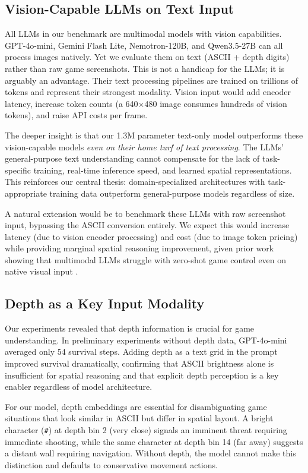 \documentclass[11pt,a4paper]{article}
\begin{document}
\subsection{Vision-Capable LLMs on Text Input}

All LLMs in our benchmark are multimodal models with vision capabilities. GPT-4o-mini, Gemini Flash Lite, Nemotron-120B, and Qwen3.5-27B can all process images natively. Yet we evaluate them on text (ASCII + depth digits) rather than raw game screenshots. This is not a handicap for the LLMs; it is arguably an advantage. Their text processing pipelines are trained on trillions of tokens and represent their strongest modality. Vision input would add encoder latency, increase token counts (a 640$\times$480 image consumes hundreds of vision tokens), and raise API costs per frame.

The deeper insight is that our 1.3M parameter text-only model outperforms these vision-capable models \textit{even on their home turf of text processing}. The LLMs' general-purpose text understanding cannot compensate for the lack of task-specific training, real-time inference speed, and learned spatial representations. This reinforces our central thesis: domain-specialized architectures with task-appropriate training data outperform general-purpose models regardless of size.

A natural extension would be to benchmark these LLMs with raw screenshot input, bypassing the ASCII conversion entirely. We expect this would increase latency (due to vision encoder processing) and cost (due to image token pricing) while providing marginal spatial reasoning improvement, given prior work showing that multimodal LLMs struggle with zero-shot game control even on native visual input \citep{waytowich2024atarigpt}.

\subsection{Depth as a Key Input Modality}

Our experiments revealed that depth information is crucial for game understanding. In preliminary experiments without depth data, GPT-4o-mini averaged only 54 survival steps. Adding depth as a text grid in the prompt improved survival dramatically, confirming that ASCII brightness alone is insufficient for spatial reasoning and that explicit depth perception is a key enabler regardless of model architecture.

For our model, depth embeddings are essential for disambiguating game situations that look similar in ASCII but differ in spatial layout. A bright character (\texttt{\#}) at depth bin 2 (very close) signals an imminent threat requiring immediate shooting, while the same character at depth bin 14 (far away) suggests a distant wall requiring navigation. Without depth, the model cannot make this distinction and defaults to conservative movement actions.
\end{document}
